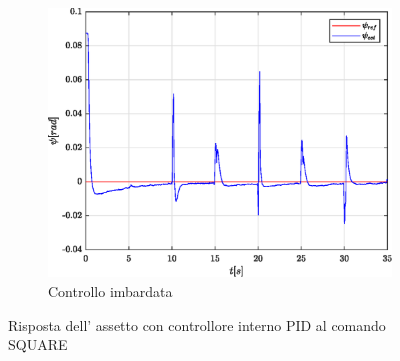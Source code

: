 \begin{figure}
	\hfill
	\begin{subfigure}{0.45\textwidth}
		\centering
		\includegraphics[width=1\textwidth]{Simulazioni/Figure/PID/SQUARE/AttitudeControlYaw}
		\caption{Controllo imbardata}
		\label{fig:SQUAREerryawPID}
	\end{subfigure}
	\caption{Risposta dell' assetto con controllore interno PID al comando SQUARE}
\end{figure}


